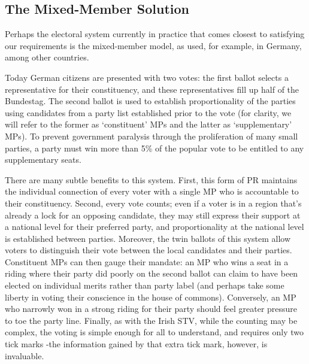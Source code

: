 \documentclass[DIV=calc, paper=a4, fontsize=11pt, twocolumn]{scrartcl}	 %
\begin{document}
\subsection{The Mixed-Member Solution}
\label{sec:german_model}

Perhaps the electoral system currently in practice that comes closest to satisfying our requirements is the mixed-member model, as used, for example, in Germany, among other countries.

Today German citizens are presented with two votes: the first ballot selects a representative for their constituency, and these representatives fill up half of the Bundestag. The second ballot is used to establish proportionality of the parties using candidates from a party list established prior to the vote
(for clarity, we will refer to the former as `constituent' MPs  and the latter as `supplementary' MPs).
To prevent government paralysis through the proliferation of many small parties, a party must win more than 5\% of the popular vote to be entitled to any supplementary seats.

There are many subtle benefits to this system. 
First, this form of PR maintains the individual connection of every voter with a single MP who is accountable to their constituency.
Second, every vote counts; even if a voter is in a region that's already a lock for an opposing candidate, they may still express their support at a national level for their preferred party, and  proportionality at the national level is established between parties.
Moreover, the twin ballots of this system allow voters to distinguish their vote between the local candidates and their parties.  Constituent MPs can then gauge their mandate: an MP who wins a seat in a riding where their party did poorly on the second ballot can claim to have been elected on individual merits rather than party label (and perhaps take some liberty in voting their conscience in the house of commons). Conversely, an MP who narrowly won in a strong riding for their party should feel greater pressure to toe the party line.
Finally, as with the Irish STV, while the counting may be complex, the voting is simple enough for all to understand, and requires only two tick marks \--the information gained by that extra tick mark, however, is invaluable.
\end{document}
